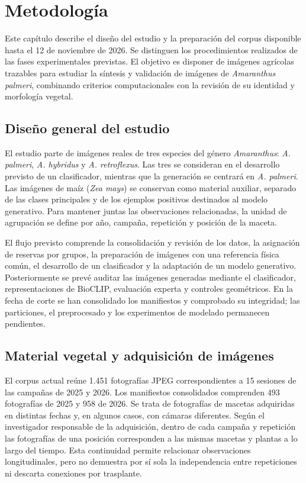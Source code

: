 \chapter{Metodología}

Este capítulo describe el diseño del estudio y la preparación del corpus disponible hasta el 12 de noviembre de 2026. Se distinguen los procedimientos realizados de las fases experimentales previstas. El objetivo es disponer de imágenes agrícolas trazables para estudiar la síntesis y validación de imágenes de \textit{Amaranthus palmeri}, combinando criterios computacionales con la revisión de su identidad y morfología vegetal.

\section{Diseño general del estudio}

El estudio parte de imágenes reales de tres especies del género \textit{Amaranthus}: \textit{A. palmeri}, \textit{A. hybridus} y \textit{A. retroflexus}. Las tres se consideran en el desarrollo previsto de un clasificador, mientras que la generación se centrará en \textit{A. palmeri}. Las imágenes de maíz (\textit{Zea mays}) se conservan como material auxiliar, separado de las clases principales y de los ejemplos positivos destinados al modelo generativo. Para mantener juntas las observaciones relacionadas, la unidad de agrupación se define por año, campaña, repetición y posición de la maceta.

El flujo previsto comprende la consolidación y revisión de los datos, la asignación de reservas por grupos, la preparación de imágenes con una referencia física común, el desarrollo de un clasificador y la adaptación de un modelo generativo. Posteriormente se prevé auditar las imágenes generadas mediante el clasificador, representaciones de BioCLIP, evaluación experta y controles geométricos. En la fecha de corte se han consolidado los manifiestos y comprobado su integridad; las particiones, el preprocesado y los experimentos de modelado permanecen pendientes.

\section{Material vegetal y adquisición de imágenes}

El corpus actual reúne 1.451 fotografías JPEG correspondientes a 15 sesiones de las campañas de 2025 y 2026. Los manifiestos consolidados comprenden 493 fotografías de 2025 y 958 de 2026. Se trata de fotografías de macetas adquiridas en distintas fechas y, en algunos casos, con cámaras diferentes. Según el investigador responsable de la adquisición, dentro de cada campaña y repetición las fotografías de una posición corresponden a las mismas macetas y plantas a lo largo del tiempo. Esta continuidad permite relacionar observaciones longitudinales, pero no demuestra por sí sola la independencia entre repeticiones ni descarta conexiones por trasplante.

